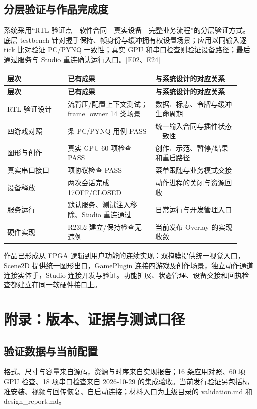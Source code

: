 \subsection{分层验证与作品完成度}
系统采用“RTL 验证点—软件合同—真实设备—完整业务流程”的分层验证方式。底层 testbench 针对握手保持、帧身份与缓冲拥有权设置场景；应用以同输入逐 tick 比对验证 PC/PYNQ 一致性；真实 GPU 和串口检查则验证设备路径；最后通过服务与 Studio 重连确认运行入口。[E02、E24]

{\small\renewcommand{\arraystretch}{1.28}
\begin{longtable}{@{}>{\raggedright\arraybackslash}p{0.24\linewidth}>{\raggedright\arraybackslash}p{0.35\linewidth}>{\raggedright\arraybackslash}p{0.34\linewidth}@{}}
\toprule
\bfseries 层次 & \bfseries 已有成果 & \bfseries 与系统设计的对应关系\\\midrule
\endfirsthead
\toprule
\bfseries 层次 & \bfseries 已有成果 & \bfseries 与系统设计的对应关系\\\midrule
\endhead
\bottomrule\endfoot
RTL 验证设计 & 流背压/配置上下文测试；frame\_owner 14 类场景 & 数据、标志、令牌与缓冲生命周期\\
四游戏对照 & 16 条 PC/PYNQ 用例 PASS & 统一输入合同与插件状态一致性\\
图形与创作 & 真实 GPU 60 项检查 PASS & 创作、示范、暂停/结果和重启路径\\
真实串口接口 & 18 项协议检查 PASS & 菜单跟随与业务模式交接\\
设备释放 & 两次会话完成 17OFF/CLOSED & 动作进程的关闭与资源回收\\
服务运行 & 默认服务、测试注入移除、Studio 重连通过 & 日常运行与开发管理入口\\
硬件实现 & R23b2 建立/保持检查无违例 & 当前发布 Overlay 的实现收敛\\
\end{longtable}}
作品已形成从 FPGA 逻辑到用户功能的连续实现：双掩膜提供统一视觉入口，Scene2D 提供统一图形出口，GamePlugin 连接四游戏及创作场景，独立动作通道连接实体手，Studio 连接开发与验证。功能扩展、状态管理、设备交接和回执检查都建立在同一软硬件接口上。

\clearpage
\section{附录：版本、证据与测试口径}
\subsection{验证数据与当前配置}
格式、尺寸与容量来自源码，资源与时序来自实现报告；16 条应用对照、60 项 GPU 检查、18 项串口检查来自 2026-10-29 的集成验收。当前发行验证另包括标准安装、视频与回传恢复、自启动连接；材料入口为上级目录的 validation.md 和 design\_report.md。

